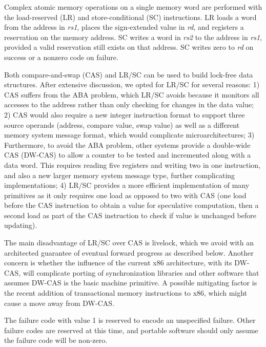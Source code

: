 Complex atomic memory operations on a single memory word are performed
with the load-reserved (LR) and store-conditional (SC) instructions.
LR loads a word from the address in {\em rs1}, places the
sign-extended value in {\em rd}, and registers a reservation on the
memory address.  SC writes a word in {\em rs2} to the address in {\em
  rs1}, provided a valid reservation still exists on that address.  SC
writes zero to {\em rd} on success or a nonzero code on failure.

\begin{commentary}
Both compare-and-swap (CAS) and LR/SC can be used to build lock-free
data structures.  After extensive discussion, we opted for LR/SC for
several reasons: 1) CAS suffers from the ABA problem, which LR/SC
avoids because it monitors all accesses to the address rather than
only checking for changes in the data value; 2) CAS would also require
a new integer instruction format to support three source operands
(address, compare value, swap value) as well as a different memory
system message format, which would complicate microarchitectures; 3)
Furthermore, to avoid the ABA problem, other systems provide a
double-wide CAS (DW-CAS) to allow a counter to be tested and
incremented along with a data word. This requires reading five
registers and writing two in one instruction, and also a new larger
memory system message type, further complicating implementations; 4)
LR/SC provides a more efficient implementation of many primitives as
it only requires one load as opposed to two with CAS (one load before
the CAS instruction to obtain a value for speculative computation,
then a second load as part of the CAS instruction to check if value is
unchanged before updating).

The main disadvantage of LR/SC over CAS is livelock, which we avoid
with an architected guarantee of eventual forward progress as
described below.  Another concern is whether the influence of the
current x86 architecture, with its DW-CAS, will complicate porting of
synchronization libraries and other software that assumes DW-CAS is
the basic machine primitive.  A possible mitigating factor is the
recent addition of transactional memory instructions to x86, which
might cause a move away from DW-CAS.
\end{commentary}

The failure code with value 1 is reserved to encode an unspecified
failure.  Other failure codes are reserved at this time, and portable
software should only assume the failure code will be non-zero.


